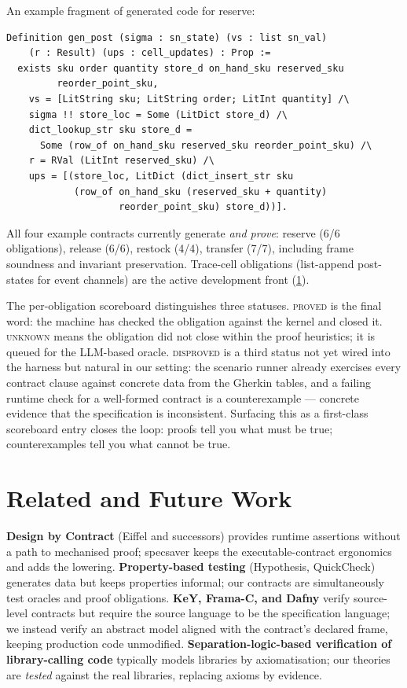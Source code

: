 \documentclass[11pt,a4paper]{article}
\begin{document}
An example fragment of generated code for reserve:

\begin{lstlisting}[style=coq]
Definition gen_post (sigma : sn_state) (vs : list sn_val)
    (r : Result) (ups : cell_updates) : Prop :=
  exists sku order quantity store_d on_hand_sku reserved_sku
         reorder_point_sku,
    vs = [LitString sku; LitString order; LitInt quantity] /\
    sigma !! store_loc = Some (LitDict store_d) /\
    dict_lookup_str sku store_d =
      Some (row_of on_hand_sku reserved_sku reorder_point_sku) /\
    r = RVal (LitInt reserved_sku) /\
    ups = [(store_loc, LitDict (dict_insert_str sku
            (row_of on_hand_sku (reserved_sku + quantity)
                    reorder_point_sku) store_d))].
\end{lstlisting}

All four example contracts currently generate \emph{and prove}: reserve
(6/6 obligations), release (6/6), restock (4/4), transfer (7/7),
including frame soundness and invariant preservation.  Trace-cell
obligations (list-append post-states for event channels) are the
active development front (\cref{sec:related}).

The per-obligation scoreboard distinguishes three statuses.
\textsc{proved} is the final word: the machine has checked the
obligation against the kernel and closed it.  \textsc{unknown} means
the obligation did not close within the proof heuristics; it is
queued for the LLM-based oracle.  \textsc{disproved} is a third
status not yet wired into the harness but natural in our setting: the
scenario runner already exercises every contract clause against
concrete data from the Gherkin tables, and a failing runtime check for
a well-formed contract is a counterexample --- concrete evidence that
the specification is inconsistent.  Surfacing this as a first-class
scoreboard entry closes the loop: proofs tell you what must be true;
counterexamples tell you what cannot be true.



\section{Related and Future Work}\label{sec:related}

\textbf{Design by Contract} (Eiffel and successors) provides runtime
assertions without a path to mechanised proof; \textsf{specsaver}
keeps the executable-contract ergonomics and adds the lowering.
\textbf{Property-based testing} (Hypothesis, QuickCheck) generates
data but keeps properties informal; our contracts are simultaneously
test oracles and proof obligations.  \textbf{KeY, Frama-C, and Dafny}
verify source-level contracts but require the source language to be
the specification language; we instead verify an abstract model
aligned with the contract's declared frame, keeping production code
unmodified.  \textbf{Separation-logic-based verification of
library-calling code} typically models libraries by axiomatisation;
our theories are \emph{tested} against the real libraries, replacing
axioms by evidence.
\end{document}

